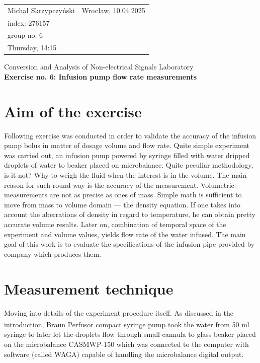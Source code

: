\documentclass[12pt,a4paper]{article}
\makeatletter
\newcommand{\name}{}
\newcommand{\Sindex}{}
\newcommand{\group}{}
\newcommand{\class}{}
\newcommand{\dateplace}{}
\newcommand{\course}{}
\newcommand{\exTitle}{}
\renewcommand{\maketitle}{
	\begin{table}[]
		\centering
		\begin{tabular*}{\textwidth}{@{} l @{\extracolsep{\fill}} r @{}}
			\name & Wrocław, \dateplace \\
			index: \Sindex & \\
			group no. \group & \\
			Thursday, \class & \\
		\end{tabular*}
	\end{table}
	\begin{center}
		\course \\
		\vspace{.3cm}
		{\Large \bfseries \exTitle}
	\end{center}
	\vspace{-.3cm}
}
\makeatother
\begin{document}
	\renewcommand{\name}{Michał Skrzypczyński}
	\renewcommand{\Sindex}{276157}
	\renewcommand{\group}{6}
	\renewcommand{\class}{14:15}
	\renewcommand{\dateplace}{10.04.2025}
	\renewcommand{\course}{Conversion and Analysis of Non-electrical Signals Laboratory}
	\renewcommand{\exTitle}{Exercise no. 6: Infusion pump flow rate measurements}
	
	\maketitle
	\section{Aim of the exercise}
	Following exercise was conducted in order to validate the accuracy of the infusion pump bolus in matter of dosage volume and flow rate. Quite simple experiment was carried out, an infusion pump powered by syringe filled with water dripped droplets of water to beaker placed on microbalance. Quite peculiar methodology, is it not? Why to weigh the fluid when the interest is in the volume. The main reason for such round way is the accuracy of the measurement. Volumetric measurements are not as precise as ones of mass. Simple math is sufficient to move from mass to volume domain --- the density equation. If one takes into account the aberrations of density in regard to temperature, he can obtain pretty accurate volume results. Later on, combination of temporal space of the experiment and volume values, yields flow rate of the water infused. The main goal of this work is to evaluate the specifications of the infusion pipe provided by company which produces them.
	
	\section{Measurement technique}
	Moving into details of the experiment procedure itself. As discussed in the introduction, Braun Perfusor\textsuperscript{\tiny\textregistered} compact syringe pump took the water from 50 ml syringe to later let the droplets flow through small cannula to glass beaker placed on the microbalance CASMWP-150 which was connected to the computer with software (called WAGA) capable of handling the microbalance digital output.
	
\end{document}
